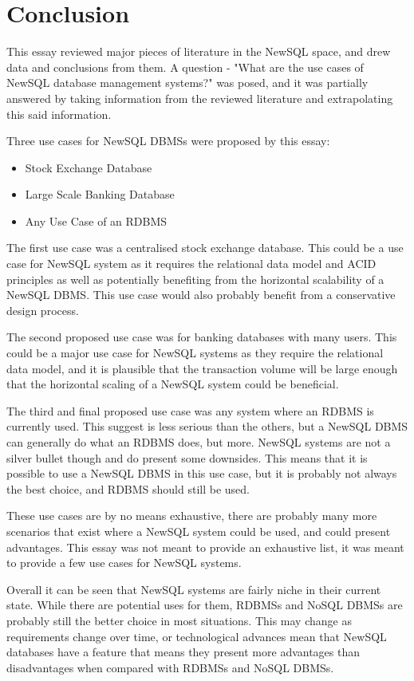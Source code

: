 \documentclass[10pt, conference]{IEEEtran}
\begin{document}
\section{Conclusion}

This essay reviewed major pieces of literature in the NewSQL space, and drew data and conclusions from them. A question - "What are the use cases of NewSQL database management systems?" was posed, and it was partially answered by taking information from the reviewed literature and extrapolating this said information.

Three use cases for NewSQL DBMSs were proposed by this essay:

\begin{itemize}
	\item{Stock Exchange Database}
	\item{Large Scale Banking Database}
	\item{Any Use Case of an RDBMS}
\end{itemize}



The first use case was a centralised stock exchange database. This could be a use case for NewSQL system as it requires the relational data model and ACID principles as well as potentially benefiting from the horizontal scalability of a NewSQL DBMS. This use case would also probably benefit from a conservative design process.

The second proposed use case was for banking databases with many users. This could be a major use case for NewSQL systems as they require the relational data model, and it is plausible that the transaction volume will be large enough that the horizontal scaling of a NewSQL system could be beneficial.

The third and final proposed use case was any system where an RDBMS is currently used. This suggest is less serious than the others, but a NewSQL DBMS can generally do what an RDBMS does, but more. NewSQL systems are not a silver bullet though and do present some downsides. This means that it is possible to use a NewSQL DBMS in this use case, but it is probably not always the best choice, and RDBMS should still be used.

These use cases are by no means exhaustive, there are probably many more scenarios that exist where a NewSQL system could be used, and could present advantages. This essay was not meant to provide an exhaustive list, it was meant to provide a few use cases for NewSQL systems.

Overall it can be seen that NewSQL systems are fairly niche in their current state. While there are potential uses for them, RDBMSs and NoSQL DBMSs are probably still the better choice in most situations. This may change as requirements change over time, or technological advances mean that NewSQL databases have a feature that means they present more advantages than disadvantages when compared with RDBMSs and NoSQL DBMSs.
\end{document}
